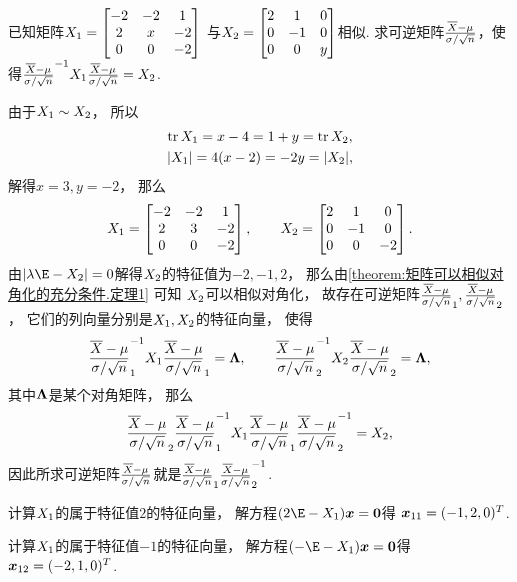 \begin{example}
已知矩阵\(X_1 = \begin{bmatrix}
	-2 & -2 & 1 \\
	2 & x & -2 \\
	0 & 0 & -2
\end{bmatrix}\)
与\(X_2 = \begin{bmatrix}
	2 & 1 & 0 \\
	0 & -1 & 0 \\
	0 & 0 & y
\end{bmatrix}\)相似.
求可逆矩阵\(\P\)，使得\(\P^{-1} \A \P = \B\).
\begin{solution}
由于\(X_1 \sim X_2\)，
所以\begin{gather*}
	\tr X_1 = x - 4 = 1 + y = \tr X_2, \\
	\abs{X_1} = 4(x-2) = -2y = \abs{X_2},
\end{gather*}
解得\(x=3,
y=-2\)，
那么\begin{equation*}
	X_1 = \begin{bmatrix}
		-2 & -2 & 1 \\
		2 & 3 & -2 \\
		0 & 0 & -2
	\end{bmatrix},
	\qquad
	X_2 = \begin{bmatrix}
		2 & 1 & 0 \\
		0 & -1 & 0 \\
		0 & 0 & -2
	\end{bmatrix}.
\end{equation*}
由\(\abs{\lambda\E-\B}=0\)解得\(X_2\)的特征值为\(-2,-1,2\)，
那么由\cref{theorem:矩阵可以相似对角化的充分条件.定理1} 可知
\(X_2\)可以相似对角化，
故存在可逆矩阵\(\P_1,\P_2\)，
它们的列向量分别是\(X_1,X_2\)的特征向量，
使得\begin{equation*}
	\P_1^{-1} \A \P_1 = \vb\Lambda,
	\qquad
	\P_2^{-1} \B \P_2 = \vb\Lambda,
\end{equation*}
其中\(\boldsymbol\Lambda\)是某个对角矩阵，
那么\begin{equation*}
	\P_2 \P_1^{-1} \A \P_1 \P_2^{-1} = \B,
\end{equation*}
因此所求可逆矩阵\(\P\)就是\(\P_1 \P_2^{-1}\).

计算\(X_1\)的属于特征值\(2\)的特征向量，
解方程\((2\E-\A) \vb{x} = \vb0\)得
\(\boldsymbol{x}_{11} = (-1,2,0)^T\).

计算\(X_1\)的属于特征值\(-1\)的特征向量，
解方程\((-\E-\A) \vb{x} = \vb0\)得
\(\boldsymbol{x}_{12} = (-2,1,0)^T\).


\end{solution}
\end{example}
